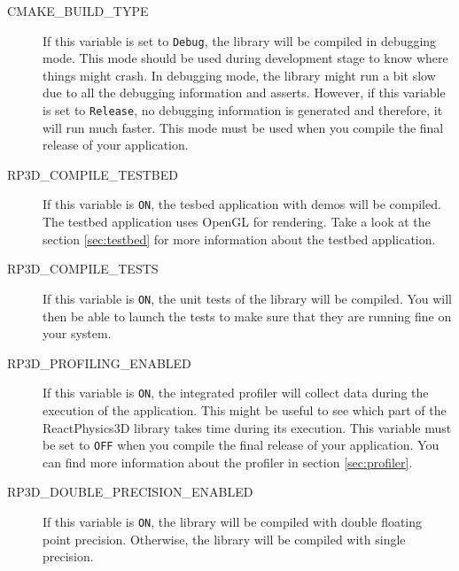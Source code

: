 \documentclass[a4paper,12pt]{article}
\begin{document}
       \begin{description}
         \item[CMAKE\_BUILD\_TYPE] If this variable is set to \texttt{Debug}, the library will be compiled in debugging mode.
                                                    This mode should be used during development stage to know where things might crash.
                                                    In debugging mode, the library might run a bit slow due to all the debugging information and asserts.
                                                    However, if this variable is set to \texttt{Release}, no debugging information is generated
                                                    and therefore, it will run much faster. This mode must be used when you compile the final
                                                    release of your application.

         \item[RP3D\_COMPILE\_TESTBED] If this variable is \texttt{ON}, the tesbed application with demos will be compiled.
                                                         The testbed application uses OpenGL for rendering.
                                                         Take a look at the section \ref{sec:testbed} for more information about the testbed application.

         \item[RP3D\_COMPILE\_TESTS] If this variable is \texttt{ON}, the unit tests of the library will be compiled. You will then
                                             be able to launch the tests to make sure that they are running fine on your system.

          \item[RP3D\_PROFILING\_ENABLED] If this variable is \texttt{ON}, the integrated profiler will collect data during the execution of the application.
                                                      This might be useful to see which part of the ReactPhysics3D
                                                      library takes time during its execution. This variable must be set to \texttt{OFF} when you compile
						      the final release of your application. You can find more information about the profiler in section \ref{sec:profiler}.

          \item[RP3D\_DOUBLE\_PRECISION\_ENABLED] If this variable is \texttt{ON}, the library will be compiled with double floating point precision.
                                                                    Otherwise, the library will be compiled with single precision.
       \end{description}
\end{document}

